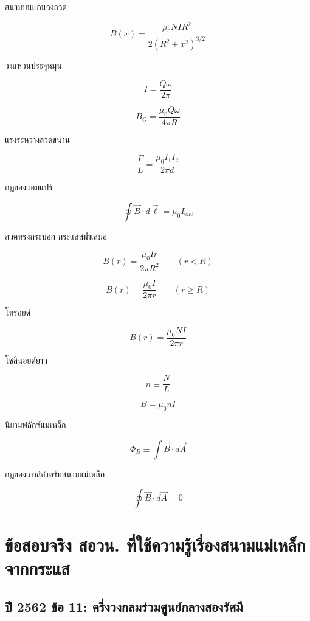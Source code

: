 \begin{tcolorbox}[title={สรุปบท: สนามแม่เหล็กจากวงจรไฟฟ้า ต่อ}]
สนามบนแกนวงลวด

\[
B(x)
=
\frac{\mu_0NIR^2}{2(R^2+x^2)^{3/2}}
\]

วงแหวนประจุหมุน

\[
I=\frac{Q\omega}{2\pi}
\]

\[
B_O=\frac{\mu_0Q\omega}{4\pi R}
\]

แรงระหว่างลวดขนาน

\[
\frac{F}{L}
=
\frac{\mu_0I_1I_2}{2\pi d}
\]

กฎของแอมแปร์

\[
\oint\vec{B}\cdot d\vec{\ell}
=
\mu_0I_{\text{enc}}
\]

ลวดทรงกระบอก กระแสสม่ำเสมอ

\[
B(r)=\frac{\mu_0Ir}{2\pi R^2}
\qquad (r<R)
\]

\[
B(r)=\frac{\mu_0I}{2\pi r}
\qquad (r\ge R)
\]
\end{tcolorbox}

\begin{tcolorbox}[title={สรุปบท: สนามแม่เหล็กจากวงจรไฟฟ้า ต่อ}]
โทรอยด์

\[
B(r)=\frac{\mu_0NI}{2\pi r}
\]

โซลินอยด์ยาว

\[
n\equiv\frac{N}{L}
\]

\[
B=\mu_0nI
\]

นิยามฟลักซ์แม่เหล็ก

\[
\Phi_B\equiv\int\vec{B}\cdot d\vec{A}
\]

กฎของเกาส์สำหรับสนามแม่เหล็ก

\[
\oint\vec{B}\cdot d\vec{A}=0
\]
\end{tcolorbox}

\section{ข้อสอบจริง สอวน. ที่ใช้ความรู้เรื่องสนามแม่เหล็กจากกระแส}


\subsection{ปี 2562 ข้อ 11: ครึ่งวงกลมร่วมศูนย์กลางสองรัศมี}

